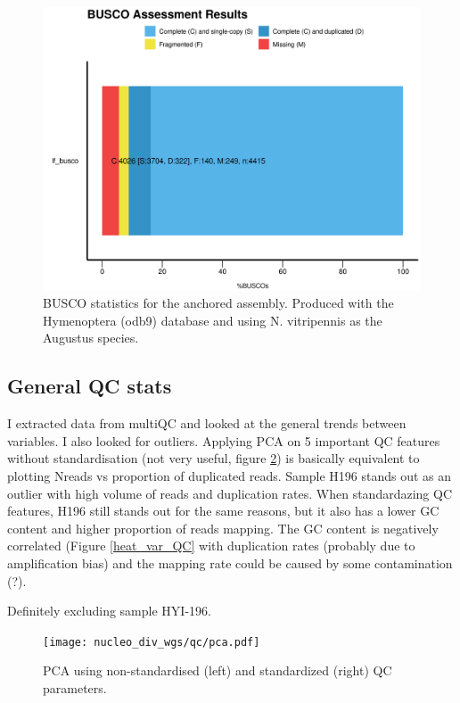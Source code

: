 \documentclass[10pt,a4paper]{report}
\begin{document}
\begin{figure}
\includegraphics[width=\textwidth]{nucleo_div_wgs/qc/busco_figure.png}
\caption{BUSCO statistics for the anchored assembly. Produced with the Hymenoptera (odb9) database and using N. vitripennis as the Augustus species.}
\label{PCR_dup}
\end{figure}

\subsection{General QC stats}
I extracted data from multiQC and looked at the general trends between variables. I also looked for outliers.  Applying PCA  on 5 important QC features without standardisation (not very useful, figure \ref{PCA_QC}) is basically equivalent to plotting Nreads vs proportion of duplicated reads. Sample H196 stands out as an outlier with high volume of reads and duplication rates. When standardazing QC features, H196 still stands out for the same reasons, but it also has a lower GC content and higher proportion of reads mapping. The GC content is negatively correlated (Figure \ref{heat_var_QC} with duplication rates (probably due to amplification bias) and the mapping rate could be caused by some contamination (?).

Definitely excluding sample HYI-196.

\begin{figure}
\texttt{[image: nucleo\_div\_wgs/qc/pca.pdf]}
\caption{PCA using non-standardised (left) and standardized (right) QC parameters.}
\label{PCA_QC}
\end{figure}
\end{document}
